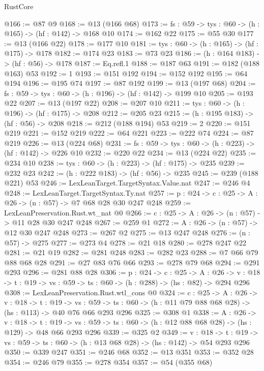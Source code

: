 \begin{lexlean}{RustCore}
\begin{coremodule}
@166 := @87 @9
@168 := @13 (@166 @68)
@173 := {fs : @59} -> {tys : @60} -> (h : @165) -> (hf : @142) -> @168 @10
@174 := @162 @22
@175 := @55 @30
@177 := @13 (@166 @22)
@178 := @177 @10
@181 := {tys : @60} -> (h : @165) -> (hf : @175) -> @178
@182 := @174 @23
@183 := @73 @23
@186 := (h : @164 @183) -> (hf : @56) -> @178
@187 := Eq.refl.{1}
@188 := @187 @63
@191 := @182 (@188 @163) @53
@192 := 1
@193 := @151 @192
@194 := @152 @192
@195 := @64 @194
@196 := @195 @74
@197 := @87 @192
@199 := @13 (@197 @68)
@204 := {fs : @59} -> {tys : @60} -> (h : @196) -> (hf : @142) -> @199 @10
@205 := @193 @22
@207 := @13 (@197 @22)
@208 := @207 @10
@211 := {tys : @60} -> (h : @196) -> (hf : @175) -> @208
@212 := @205 @23
@215 := (h : @195 @183) -> (hf : @56) -> @208
@218 := @212 (@188 @194) @53
@219 := 2
@220 := @151 @219
@221 := @152 @219
@222 := @64 @221
@223 := @222 @74
@224 := @87 @219
@226 := @13 (@224 @68)
@231 := {fs : @59} -> {tys : @60} -> (h : @223) -> (hf : @142) -> @226 @10
@232 := @220 @22
@234 := @13 (@224 @22)
@235 := @234 @10
@238 := {tys : @60} -> (h : @223) -> (hf : @175) -> @235
@239 := @232 @23
@242 := (h : @222 @183) -> (hf : @56) -> @235
@245 := @239 (@188 @221) @53
@246 := LexLeanTarget.TargetSyntax.Value.nat
@247 := @246 @4
@248 := LexLeanTarget.TargetSyntax.Ty.nat
@257 := {p : @24} -> {c : @25} -> {A : @26} -> (n : @57) -> @7 @68 @28 @30 @247 @248
@259 := LexLeanPreservation.Rust.wt_nat @0
@266 := {c : @25} -> {A : @26} -> (n : @57) -> @11 @28 @30 @247 @248
@267 := @259 @1
@272 := {A : @26} -> (n : @57) -> @12 @30 @247 @248
@273 := @267 @2
@275 := @13 @247 @248
@276 := (n : @57) -> @275
@277 := @273 @4
@278 := @21 @18
@280 := @278 @247 @22
@281 := @21 @19
@282 := @281 @248
@283 := @282 @23
@288 := @7 @66 @79 @88 @68 @28
@291 := @27 @83 @76 @66
@293 := @278 @79 @68
@294 := @291 @293
@296 := @281 @88 @28
@306 := {p : @24} ->
  {c : @25} ->
  {A : @26} ->
  {v : @18} -> {t : @19} -> {vs : @59} -> {ts : @60} -> (h : @288) -> (hs : @82) -> @294 @296
@308 := LexLeanPreservation.Rust.wtl_cons @0
@324 := {c : @25} ->
  {A : @26} ->
  {v : @18} ->
  {t : @19} ->
  {vs : @59} -> {ts : @60} -> (h : @11 @79 @88 @68 @28) -> (hs : @113) -> @40 @76 @66 @293 @296
@325 := @308 @1
@338 := {A : @26} ->
  {v : @18} ->
  {t : @19} -> {vs : @59} -> {ts : @60} -> (h : @12 @88 @68 @28) -> (hs : @129) -> @48 @66 @293 @296
@339 := @325 @2
@349 := {v : @18} ->
  {t : @19} -> {vs : @59} -> {ts : @60} -> (h : @13 @68 @28) -> (hs : @142) -> @54 @293 @296
@350 := @339 @247
@351 := @246 @68
@352 := @13 @351
@353 := @352 @28
@354 := @246 @79
@355 := @278 @354
@357 := @54 (@355 @68)

\end{coremodule}
\end{lexlean}
